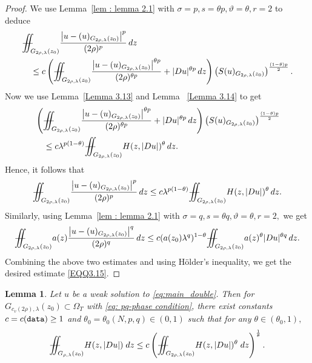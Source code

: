 \documentclass[notitlepage,11pt,reqno]{amsart}
\newtheorem{lemma}[theorem]{Lemma}
\theoremstyle{definition}
\numberwithin{equation}{section}
\newcommand{\iintss}{{\int\hspace{-0.28cm}\int}}
\newcommand{ \miints }{{\iintss\hspace{-0.56cm} -\hspace{-0.15cm}-}}
\newcommand{\miint}[1]{{\miints_{\hspace{-0.13cm}#1}}}
\begin{document}
\begin{proof}
 We use Lemma~\ref{lem : lemma 2.1} with $\sigma=p, s=\theta p, \vartheta= \theta, r=2$ to deduce
 \begin{align*}
    &\miint{G_{2\rho, \lambda}(z_0)}\frac{\left|u-(u)_{G_{2\rho, \lambda}(z_0)}\right|^p}{(2 \rho)^p}\, dz\\
     &\quad \leq c\left(\miint{G_{2\rho, \lambda}(z_0)}\frac{\left|u-(u)_{G_{2\rho, \lambda}(z_0)}\right|^{\theta p}}{(2 \rho)^{\theta p}}+|Du|^{\theta p}\, dz\right)\left(S(u)_{G_{2\rho, \lambda}(z_0)}\right)^{\frac{(1-\theta)p}{2}}.
 \end{align*}
 Now we use Lemma~\ref{Lemma 3.13} and Lemma ~\ref{Lemma 3.14} to get
 \begin{align*}
&\left(\miint{G_{2\rho, \lambda}(z_0)}\frac{\left|u-(u)_{G_{2\rho, \lambda}(z_0)}\right|^{\theta p}}{(2 \rho)^{\theta p}}+|Du|^{\theta p}\, dz\right)\left(S(u)_{G_{2\rho, \lambda}(z_0)}\right)^{\frac{(1-\theta)p}{2}}\\
&\quad \leq c \lambda^{p(1-\theta)}\miint{G_{2\rho, \lambda}(z_0)}H(z, |Du|)^{\theta}\, dz.
 \end{align*}
 Hence, it follows that
 \begin{align*}
 \miint{G_{2\rho, \lambda}(z_0)}\frac{\left|u-(u)_{G_{2\rho, \lambda}(z_0)}\right|^p}{(2 \rho)^p}\, dz\leq c \lambda^{p(1-\theta)}\miint{G_{2\rho, \lambda}(z_0)}H(z, |Du|)^{\theta}\, dz.    
 \end{align*}
 Similarly, using Lemma~\ref{lem : lemma 2.1} with $\sigma=q, s=\theta q, \vartheta= \theta, r=2,$ we get
 \begin{align*}
 \miint{G_{2\rho, \lambda}(z_0)}a(z)\frac{\left|u-(u)_{G_{2\rho, \lambda}(z_0)}\right|^q}{(2 \rho)^q}\, dz\leq c (a(z_0)\lambda^q)^{1-\theta}\miint{G_{2\rho, \lambda}(z_0)}a(z)^{\theta}|Du|^{\theta q}\, dz.        
 \end{align*}
 Combining the above two estimates and using H\"{o}lder's inequality, we get the desired estimate \eqref{EQQ3.15}.
\end{proof}
\begin{lemma}
    Let $u$ be a weak solution to \eqref{eq:main_double}. Then for $G_{c_v(2 \rho),\lambda}\left(z_0\right) \subset \Omega_T$ with \eqref{eq: pq-phase condition}, there exist constants $c=c(\textnormal{\texttt{data}}) \geq 1$ and $\theta_0=\theta_0(N,p,q) \in (0,1)$ such that for any $\theta\in (\theta_0,1),$
    \begin{align*}
        \miint{G_{\rho,\lambda}(z_0)} H(z,|Du|)\; dz\leq c \left(\miint{G_{2\rho,\lambda}(z_0)} H(z,|Du|)^\theta\;dz\right)^\frac{1}{\theta}.
    \end{align*}
\end{lemma}
\end{document}
